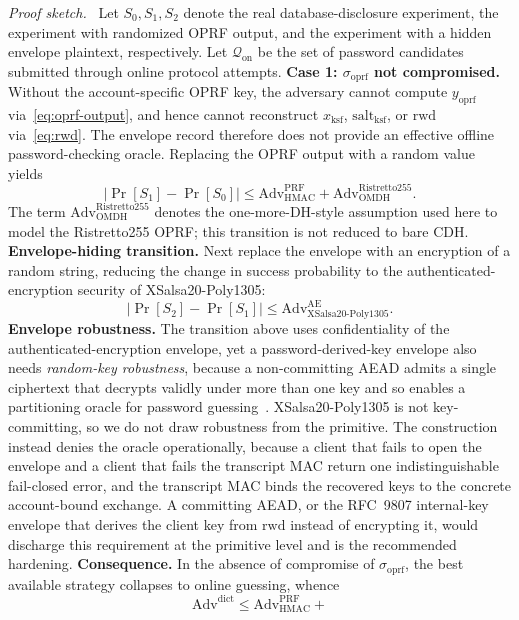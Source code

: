 \documentclass[preprint,12pt]{elsarticle}
\newcommand{\sigoprf}{\sigma_{\mathrm{oprf}}}
\theoremstyle{remark}
\newenvironment{sketchproof}{\par\noindent\textit{Proof sketch.}\ }{\par}
\begin{document}
\begin{sketchproof}
Let $S_0,S_1,S_2$ denote the real database-disclosure experiment, the
experiment with randomized OPRF output, and the experiment with a hidden
envelope plaintext, respectively. Let $\mathcal{Q}_{\mathrm{on}}$ be the
set of password candidates submitted through online protocol attempts.
\textbf{Case 1: \textnormal{$\sigoprf$ not compromised.}}
Without the account-specific OPRF key, the adversary cannot compute
$y_{\mathrm{oprf}}$ via~\eqref{eq:oprf-output}, and hence cannot
reconstruct $x_{\mathrm{ksf}}$, $\mathrm{salt}_{\mathrm{ksf}}$, or
$\mathrm{rwd}$ via~\eqref{eq:rwd}. The envelope record therefore does
not provide an effective offline password-checking oracle. Replacing
the OPRF output with a random value yields
\[
  |\Pr[S_1] - \Pr[S_0]| \leq
  \mathrm{Adv}_{\mathrm{HMAC}}^{\mathrm{PRF}} +
  \mathrm{Adv}_{\mathrm{OMDH}}^{\mathrm{Ristretto255}} .
\]
The term $\mathrm{Adv}_{\mathrm{OMDH}}^{\mathrm{Ristretto255}}$ denotes
the one-more-DH-style assumption used here to model the Ristretto255 OPRF;
this transition is not reduced to bare CDH.
\textbf{Envelope-hiding transition.} Next replace the envelope with an
encryption of a random string, reducing the change in success probability
to the authenticated-encryption security of XSalsa20-Poly1305:
\[
  |\Pr[S_2] - \Pr[S_1]| \leq
  \mathrm{Adv}_{\mathrm{XSalsa20\text{-}Poly1305}}^{\mathrm{AE}}.
\]
\textbf{Envelope robustness.} The transition above uses confidentiality of the
authenticated-encryption envelope, yet a password-derived-key envelope also
needs \emph{random-key robustness}, because a non-committing AEAD admits a single
ciphertext that decrypts validly under more than one key and so enables a
partitioning oracle for password guessing~\cite{len2021partitioning}.
XSalsa20-Poly1305 is not key-committing, so we do not draw robustness from the
primitive. The construction instead denies the oracle operationally, because a
client that fails to open the envelope and a client that fails the transcript
MAC return one indistinguishable fail-closed error, and the transcript MAC binds
the recovered keys to the concrete account-bound exchange. A committing AEAD, or
the RFC~9807 internal-key envelope that derives the client key from
$\mathrm{rwd}$ instead of encrypting it, would discharge this requirement at the
primitive level and is the recommended hardening.
\textbf{Consequence.} In the absence of compromise of
$\sigoprf$, the best available strategy collapses to online guessing,
whence
\[
  \mathrm{Adv}^{\mathrm{dict}} \leq
  \mathrm{Adv}_{\mathrm{HMAC}}^{\mathrm{PRF}} +
\]
\end{sketchproof}
\end{document}
